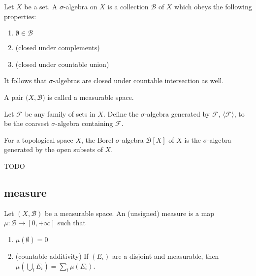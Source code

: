 \documentclass[12pt]{article}
\begin{document}
\begin{definition} 
	Let $X$ be a set. A $\sigma$-algebra on $X$ is a collection $\mathcal{B}$ of $X$ which obeys the following properties:
	\begin{enumerate}
		\item $\emptyset\in\mathcal{B}$
		\item (closed under complements)
		\item (closed under countable union)
	\end{enumerate}
\end{definition}

It follows that $\sigma$-algebras are closed under countable intersection as well.

\begin{definition}
	A pair $(X,\mathcal{B}$) is called a measurable space.
\end{definition}

\begin{definition} 
	Let $\mathcal{F}$ be any family of sets in $X$. Define the $\sigma$-algebra generated by $\mathcal{F}$, $\langle \mathcal{F}\rangle$, to be the coarsest $\sigma$-algebra containing $\mathcal{F}$.
\end{definition}

\begin{definition}
	For a topological space $X$, the Borel $\sigma$-algebra $\mathcal{B}[X]$ of $X$ is the $\sigma$-algebra generated by the open subsets of $X$.
\end{definition}

\begin{remark}
	TODO
\end{remark}


\subsection{measure} %

\begin{definition}[measure]
	Let $(X,\mathcal{B})$ be a measurable space. An (unsigned) measure is a map $\mu:\mathcal{B}\to[0,+\infty]$ such that 
	\begin{enumerate}
		\item $\mu(\emptyset)=0$
		\item (countable additivity) If $(E_i)$ are a disjoint and measurable, then $\mu(\bigcup_i E_i) = \sum_i \mu(E_i)$.
	\end{enumerate}
\end{definition}
\end{document}
